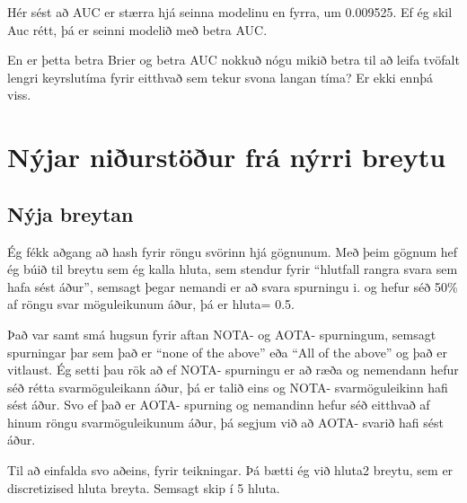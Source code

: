 \documentclass[
]{article}
\begin{document}
Hér sést að AUC er stærra hjá seinna modelinu en fyrra, um 0.009525. Ef ég skil Auc rétt, þá er seinni modelið með betra AUC.

En er þetta betra Brier og betra AUC nokkuð nógu mikið betra til að leifa tvöfalt lengri keyrslutíma fyrir eitthvað sem tekur svona langan tíma? Er ekki ennþá viss.

\hypertarget{nuxfdjar-niuxf0urstuxf6uxf0ur-fruxe1-nuxfdrri-breytu}{%
\section{Nýjar niðurstöður frá nýrri breytu}\label{nuxfdjar-niuxf0urstuxf6uxf0ur-fruxe1-nuxfdrri-breytu}}

\hypertarget{nuxfdja-breytan}{%
\subsection{Nýja breytan}\label{nuxfdja-breytan}}

Ég fékk aðgang að hash fyrir röngu svörinn hjá gögnunum. Með þeim gögnum hef ég búið til breytu sem ég kalla hluta, sem stendur fyrir ``hlutfall rangra svara sem hafa sést áður'', semsagt þegar nemandi er að svara spurningu i. og hefur séð 50\% af röngu svar möguleikunum áður, þá er hluta= 0.5.

Það var samt smá hugsun fyrir aftan NOTA- og AOTA- spurningum, semsagt spurningar þar sem það er ``none of the above'' eða ``All of the above'' og það er vitlaust. Ég setti þau rök að ef NOTA- spurningu er að ræða og nemendann hefur séð rétta svarmöguleikann áður, þá er talið eins og NOTA- svarmöguleikinn hafi sést áður. Svo ef það er AOTA- spurning og nemandinn hefur séð eitthvað af hinum röngu svarmöguleikunum áður, þá segjum við að AOTA- svarið hafi sést áður.

Til að einfalda svo aðeins, fyrir teikningar. Þá bætti ég við hluta2 breytu, sem er discretizised hluta breyta. Semsagt skip í 5 hluta.
\end{document}
